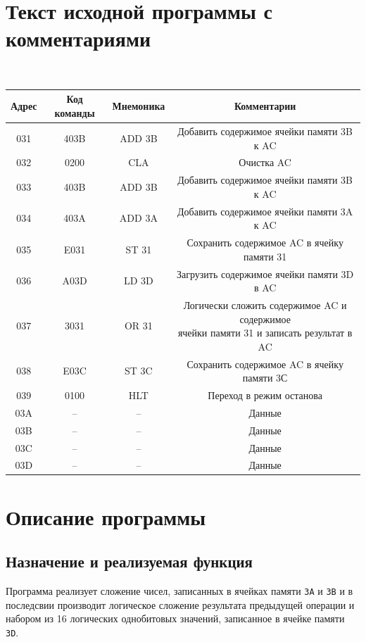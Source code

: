 \documentclass[11pt,a4paper]{article}
\begin{document}
	\section{Текст исходной программы с комментариями}
	\begin{table}[H]
		{\tt
	  \begin{tabular}{|c|c|c|c|}
	  	\hline
	  	\textbf{Адрес} & \textbf{Код команды} & \textbf{Мнемоника} &           \textbf{Комментарии}            \\ \hline
	  	     031       &         403B         &       ADD 3B       & Добавить содержимое ячейки памяти 3B к AC \\ \hline
	  	     032       &         0200         &        CLA         &                Очистка AC                 \\ \hline
	  	     033       &         403B         &       ADD 3B       & Добавить содержимое ячейки памяти 3B к AC \\ \hline
	  	     034       &         403A         &       ADD 3A       & Добавить содержимое ячейки памяти 3A к AC \\ \hline
	  	     035 & E031 & ST 31 & Сохранить содержимое AC в ячейку памяти 31\\ \hline
	  	     036 & A03D & LD 3D & Загрузить содержимое ячейки памяти 3D в AC\\ \hline
	  	     037 & 3031 & OR 31 & \makecell{Логически сложить содержимое AC и содержимое\\ ячейки памяти 31 и записать результат в AC}\\ \hline
	  	     038 & E03C & ST 3C & Сохранить содержимое AC в ячейку памяти 3С\\ \hline
	  	     039 & 0100 & HLT & Переход в режим останова\\ \hline
	  	     03A & -- & -- & Данные\\ \hline
	  	     03B & -- & -- & Данные\\ \hline
	  	     03C & -- & -- & Данные\\ \hline
	  	     03D & -- & -- & Данные\\ \hline
	  \end{tabular}
       }
    \end{table}
\section{Описание программы}
\subsection{Назначение и реализуемая функция}
Программа реализует сложение чисел, записанных в ячейках памяти \texttt{3A} и \texttt{3B} и в последсвии производит логическое сложение результата предыдущей операции и набором из 16 логических однобитовых значений, записанное в ячейке памяти \texttt{3D}.
\end{document}
